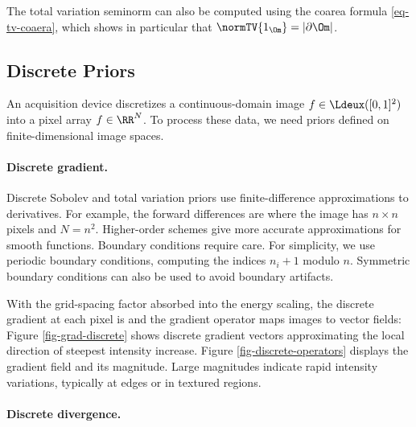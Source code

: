 The total variation seminorm can also be computed using the coarea formula \eqref{eq-tv-coaera}, which shows in particular that $\normTV{1_{\Om}} = |\partial \Om|$.


                                                                      
\subsection{Discrete Priors}
\label{subsec-disc-priors}

An acquisition device discretizes a continuous-domain image $f \in \Ldeux([0,1]^2)$ into a pixel array $f \in \RR^N$. To process these data, we need priors defined on finite-dimensional image spaces.

  
\paragraph{Discrete gradient.}

Discrete Sobolev and total variation priors use finite-difference approximations to derivatives. For example, the forward differences are
where the image has $n\times n$ pixels and $N=n^2$. Higher-order schemes give more accurate approximations for smooth functions.
Boundary conditions require care. For simplicity, we use periodic boundary conditions, computing the indices $n_i+1$ modulo $n$. Symmetric boundary conditions can also be used to avoid boundary artifacts.

With the grid-spacing factor absorbed into the energy scaling, the discrete gradient at each pixel is
and the gradient operator maps images to vector fields:
Figure \ref{fig-grad-discrete} shows discrete gradient vectors approximating the local direction of steepest intensity increase. Figure \ref{fig-discrete-operators} displays the gradient field and its magnitude. Large magnitudes indicate rapid intensity variations, typically at edges or in textured regions.


\paragraph{Discrete divergence.}

